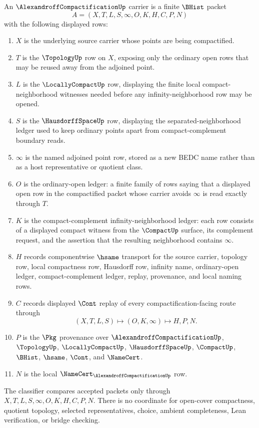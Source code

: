 \begin{definition}
\label{def:alexandroff-compactification-carrier}
An $\AlexandroffCompactificationUp$ carrier is a finite $\BHist$ packet
$$
A=(X,T,L,S,\infty,O,K,H,C,P,N)
$$
with the following displayed rows:
\begin{enumerate}
\item $X$ is the underlying source carrier whose points are being compactified.
\item $T$ is the $\TopologyUp$ row on $X$, exposing only the ordinary open rows that may be reused away from the adjoined point.
\item $L$ is the $\LocallyCompactUp$ row, displaying the finite local compact-neighborhood witnesses needed before any infinity-neighborhood row may be opened.
\item $S$ is the $\HausdorffSpaceUp$ row, displaying the separated-neighborhood ledger used to keep ordinary points apart from compact-complement boundary reads.
\item $\infty$ is the named adjoined point row, stored as a new BEDC name rather than as a host representative or quotient class.
\item $O$ is the ordinary-open ledger: a finite family of rows saying that a displayed open row in the compactified packet whose carrier avoids $\infty$ is read exactly through $T$.
\item $K$ is the compact-complement infinity-neighborhood ledger: each row consists of a displayed compact witness from the $\CompactUp$ surface, its complement request, and the assertion that the resulting neighborhood contains $\infty$.
\item $H$ records componentwise $\hsame$ transport for the source carrier, topology row, local compactness row, Hausdorff row, infinity name, ordinary-open ledger, compact-complement ledger, replay, provenance, and local naming rows.
\item $C$ records displayed $\Cont$ replay of every compactification-facing route through
$$
(X,T,L,S) \longmapsto (O,K,\infty) \longmapsto H,P,N .
$$
\item $P$ is the $\Pkg$ provenance over $\AlexandroffCompactificationUp$, $\TopologyUp$, $\LocallyCompactUp$, $\HausdorffSpaceUp$, $\CompactUp$, $\BHist$, $\hsame$, $\Cont$, and $\NameCert$.
\item $N$ is the local $\NameCert_{\AlexandroffCompactificationUp}$ row.
\end{enumerate}
The classifier compares accepted packets only through $X,T,L,S,\infty,O,K,H,C,P,N$. There is no coordinate for open-cover compactness, quotient topology, selected representatives, choice, ambient completeness, Lean verification, or bridge checking.
\end{definition}

